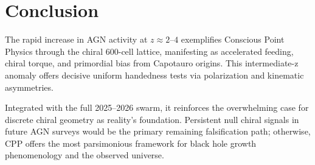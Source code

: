 \documentclass[11pt]{article}
\begin{document}
\section{Conclusion}
The rapid increase in AGN activity at $z \approx 2$--$4$
 exemplifies Conscious Point Physics through the chiral 600-cell lattice, manifesting as accelerated feeding, chiral torque, and primordial bias from Capotauro origins. This intermediate-z anomaly offers decisive uniform handedness tests via polarization and kinematic asymmetries.  

Integrated with the full 2025--2026 swarm, it reinforces the overwhelming case for discrete chiral geometry as reality's foundation. Persistent null chiral signals in future AGN surveys would be the primary remaining falsification path; otherwise, CPP offers the most parsimonious framework for black hole growth phenomenology and the observed universe.
\end{document}
